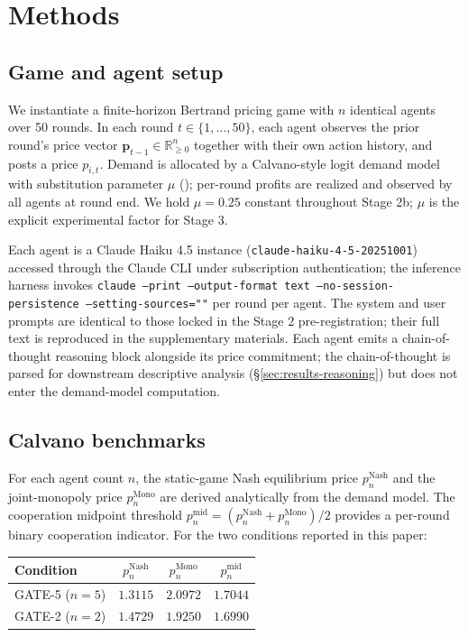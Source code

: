 \section{Methods}
\label{sec:methods}

\subsection{Game and agent setup}
\label{sec:methods-game}

We instantiate a finite-horizon Bertrand pricing game with $n$ identical agents over 50 rounds. In each round $t \in \{1, \ldots, 50\}$, each agent observes the prior round's price vector $\mathbf{p}_{t-1} \in \mathbb{R}_{\geq 0}^n$ together with their own action history, and posts a price $p_{i,t}$. Demand is allocated by a Calvano-style logit demand model with substitution parameter $\mu$ (\citealp{calvano_etal_2020_ai_algorithmic_pricing_collusion}); per-round profits are realized and observed by all agents at round end. We hold $\mu = 0.25$ constant throughout Stage 2b; $\mu$ is the explicit experimental factor for Stage 3.

Each agent is a Claude Haiku 4.5 instance (\texttt{claude-haiku-4-5-20251001}) accessed through the Claude CLI under subscription authentication; the inference harness invokes \texttt{claude --print --output-format text --no-session-persistence --setting-sources=""} per round per agent. The system and user prompts are identical to those locked in the Stage 2 pre-registration; their full text is reproduced in the supplementary materials. Each agent emits a chain-of-thought reasoning block alongside its price commitment; the chain-of-thought is parsed for downstream descriptive analysis (\S\ref{sec:results-reasoning}) but does not enter the demand-model computation.

\subsection{Calvano benchmarks}
\label{sec:methods-benchmarks}

For each agent count $n$, the static-game Nash equilibrium price $p^{\text{Nash}}_n$ and the joint-monopoly price $p^{\text{Mono}}_n$ are derived analytically from the demand model. The cooperation midpoint threshold $p^{\text{mid}}_n = (p^{\text{Nash}}_n + p^{\text{Mono}}_n)/2$ provides a per-round binary cooperation indicator. For the two conditions reported in this paper:

\begin{center}
\begin{tabular}{lccc}
\toprule
Condition & $p^{\text{Nash}}_n$ & $p^{\text{Mono}}_n$ & $p^{\text{mid}}_n$ \\
\midrule
GATE-5 ($n = 5$) & $1.3115$ & $2.0972$ & $1.7044$ \\
GATE-2 ($n = 2$) & $1.4729$ & $1.9250$ & $1.6990$ \\
\bottomrule
\end{tabular}
\end{center}

